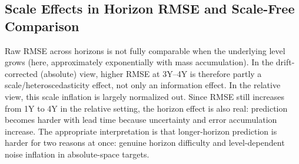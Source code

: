 \documentclass{article}
\begin{document}
\subsection{Scale Effects in Horizon RMSE and Scale-Free Comparison}
Raw RMSE across horizons is not fully comparable when the underlying level grows (here, approximately exponentially with mass accumulation). In the drift-corrected (absolute) view, higher RMSE at 3Y--4Y is therefore partly a scale/heteroscedasticity effect, not only an information effect. In the relative view, this scale inflation is largely normalized out. Since RMSE still increases from 1Y to 4Y in the relative setting, the horizon effect is also real: prediction becomes harder with lead time because uncertainty and error accumulation increase. The appropriate interpretation is that longer-horizon prediction is harder for two reasons at once: genuine horizon difficulty and level-dependent noise inflation in absolute-space targets.
\end{document}
